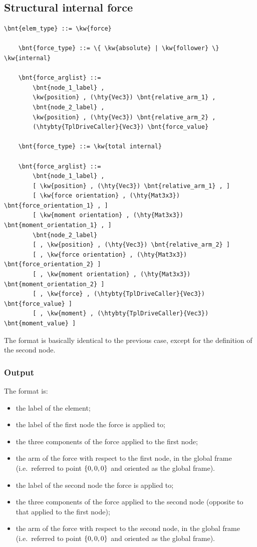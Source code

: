 \subsection{Structural internal force}
\label{sec:EL:FORCE:STRUCTURAL:INTERNAL_FORCE}
\begin{Verbatim}[commandchars=\\\{\}]
    \bnt{elem_type} ::= \kw{force}

    \bnt{force_type} ::= \{ \kw{absolute} | \kw{follower} \} \kw{internal}

    \bnt{force_arglist} ::=
        \bnt{node_1_label} , 
        \kw{position} , (\hty{Vec3}) \bnt{relative_arm_1} ,
        \bnt{node_2_label} ,
        \kw{position} , (\hty{Vec3}) \bnt{relative_arm_2} ,
        (\htybty{TplDriveCaller}{Vec3}) \bnt{force_value}

    \bnt{force_type} ::= \kw{total internal}

    \bnt{force_arglist} ::=
        \bnt{node_1_label} ,
        [ \kw{position} , (\hty{Vec3}) \bnt{relative_arm_1} , ]
        [ \kw{force orientation} , (\hty{Mat3x3}) \bnt{force_orientation_1} , ]
        [ \kw{moment orientation} , (\hty{Mat3x3}) \bnt{moment_orientation_1} , ]
        \bnt{node_2_label}
        [ , \kw{position} , (\hty{Vec3}) \bnt{relative_arm_2} ]
        [ , \kw{force orientation} , (\hty{Mat3x3}) \bnt{force_orientation_2} ]
        [ , \kw{moment orientation} , (\hty{Mat3x3}) \bnt{moment_orientation_2} ]
        [ , \kw{force} , (\htybty{TplDriveCaller}{Vec3}) \bnt{force_value} ]
        [ , \kw{moment} , (\htybty{TplDriveCaller}{Vec3}) \bnt{moment_value} ]
\end{Verbatim}
The format is basically identical to the previous case,
except for the definition of the second node.

\subsubsection{Output}
The format is:
\begin{itemize}
    \item the label of the element;
    \item the label of the first node the force is applied to;
    \item the three components of the force applied to the first node;
    \item the arm of the force with respect to the first node,
	  in the global frame (i.e.\ referred to point $ \left\{ 0,0,0 \right\} $
	  and oriented as the global frame).
    \item the label of the second node the force is applied to;
    \item the three components of the force applied to the second node
	  (opposite to that applied to the first node);
    \item the arm of the force with respect to the second node,
	  in the global frame (i.e.\ referred to point $ \left\{ 0,0,0 \right\} $
	  and oriented as the global frame).
\end{itemize}

